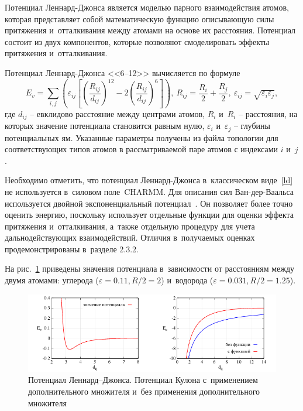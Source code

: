 Потенциал Леннард-Джонса является моделью парного взаимодействия атомов, которая представляет собой математическую функцию описывающую силы притяжения и~отталкивания между атомами на основе их расстояния. Потенциал состоит из двух компонентов, которые позволяют смоделировать эффекты притяжения и~отталкивания.

Потенциал Леннард-Джонса <<6--12>> вычисляется по формуле
\begin{equation}
	\displaystyle E_{v}=\sum _{i,j}\left(\varepsilon_{ij}\left[\left({\frac {R_{ij}}{d_{ij}}}\right)^{12}-2\left({\frac {R_{ij}}{d_{ij}}}\right)^{6}\right]\right), \ R_{ij} = \frac{R_{i}}{2} + \frac{R_{j}}{2}, \ \varepsilon_{ij} = \sqrt{\varepsilon_{i} \varepsilon_{j}},
	\label{ld}
\end{equation}
где $d_{ij}$ -- евклидово расстояние между центрами атомов, $R_{i}$ и~$R_{i}$ -- расстояния, на которых значение потенциала становится равным нулю, $\varepsilon_{i}$ и~$\varepsilon_{j}$ -- глубины потенциальных ям. Указанные параметры получены из файла топологии для соответствующих типов атомов в рассматриваемой паре атомов с индексами $i$ и~$j$.

Необходимо отметить, что потенциал Леннард-Джонса в~классическом виде~\ref{ld} не используется в~силовом поле~CHARMM. Для описания сил Ван-дер-Ваальса используется двойной экспоненциальный потенциал~\cite{wu}. Он позволяет более точно оценить энергию, поскольку использует отдельные функции для оценки эффекта притяжения и~отталкивания, а~также отдельную процедуру для учета дальнодействующих взаимодействий. Отличия в~получаемых оценках продемонстрированы в~разделе 2.3.2. 

На рис.~\ref{vdw} приведены значения потенциала в~зависимости от расстояниям между двумя атомами: углерода ($\varepsilon=0.11, R/2 = 2$) и~водорода ($\varepsilon=0.031, R/2 = 1.25$).

\begin{figure}[h!]
	\captionsetup{justification=centering}
	\centering
	\includegraphics[width=1.0\linewidth]{images/vdwelec.pdf}
	\caption{Потенциал Леннард--Джонса. Потенциал Кулона с~применением дополнительного множителя и~без применения дополнительного множителя}
	\label{vdw}
\end{figure}

